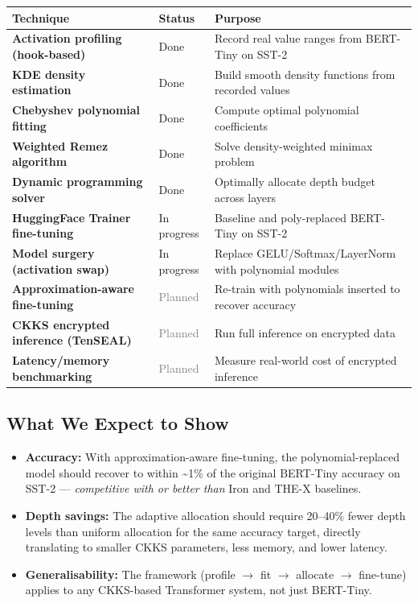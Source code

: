 \documentclass[12pt, a4paper]{article}
\begin{document}
\begin{center}
\renewcommand{\arraystretch}{1.35}
\begin{tabularx}{\textwidth}{>{\bfseries}l l X}
\toprule
\textbf{Technique} & \textbf{Status} & \textbf{Purpose} \\
\midrule
Activation profiling (hook-based) & \textcolor{contributiongreen}{Done} & Record real value ranges from BERT-Tiny on SST-2 \\
KDE density estimation & \textcolor{contributiongreen}{Done} & Build smooth density functions from recorded values \\
Chebyshev polynomial fitting & \textcolor{contributiongreen}{Done} & Compute optimal polynomial coefficients \\
Weighted Remez algorithm & \textcolor{contributiongreen}{Done} & Solve density-weighted minimax problem \\
Dynamic programming solver & \textcolor{contributiongreen}{Done} & Optimally allocate depth budget across layers \\
HuggingFace Trainer fine-tuning & \textcolor{orange!80!black}{In progress} & Baseline and poly-replaced BERT-Tiny on SST-2 \\
Model surgery (activation swap) & \textcolor{orange!80!black}{In progress} & Replace GELU/Softmax/LayerNorm with polynomial modules \\
Approximation-aware fine-tuning & \textcolor{gray}{Planned} & Re-train with polynomials inserted to recover accuracy \\
CKKS encrypted inference (TenSEAL) & \textcolor{gray}{Planned} & Run full inference on encrypted data \\
Latency/memory benchmarking & \textcolor{gray}{Planned} & Measure real-world cost of encrypted inference \\
\bottomrule
\end{tabularx}
\end{center}

\subsection*{What We Expect to Show}

\begin{itemize}[leftmargin=2em, itemsep=4pt]
  \item \textbf{Accuracy:} With approximation-aware fine-tuning, the polynomial-replaced model should recover to within \textasciitilde1\% of the original BERT-Tiny accuracy on SST-2 — \emph{competitive with or better than} Iron and THE-X baselines.
  \item \textbf{Depth savings:} The adaptive allocation should require 20--40\% fewer depth levels than uniform allocation for the same accuracy target, directly translating to smaller CKKS parameters, less memory, and lower latency.
  \item \textbf{Generalisability:} The framework (profile $\to$ fit $\to$ allocate $\to$ fine-tune) applies to any CKKS-based Transformer system, not just BERT-Tiny.
\end{itemize}
\end{document}

